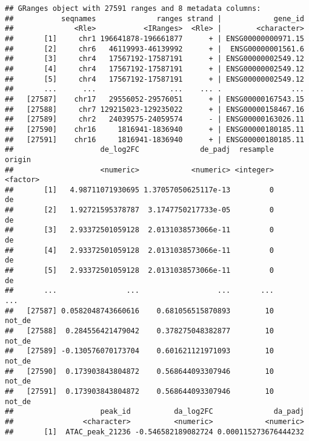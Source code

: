 \documentclass[
  9pt,
  a4paper,
]{extarticle}
\newenvironment{Shaded}{\begin{snugshade}}{\end{snugshade}}
\newcommand{\KeywordTok}[1]{\textcolor[rgb]{0.13,0.29,0.53}{\textbf{#1}}}
\newcommand{\NormalTok}[1]{#1}
\newcommand{\OperatorTok}[1]{\textcolor[rgb]{0.81,0.36,0.00}{\textbf{#1}}}
\newcommand{\StringTok}[1]{\textcolor[rgb]{0.31,0.60,0.02}{#1}}
\begin{document}
\begin{Shaded}
\end{Shaded}

\begin{verbatim}
## GRanges object with 27591 ranges and 8 metadata columns:
##           seqnames              ranges strand |            gene_id
##              <Rle>           <IRanges>  <Rle> |        <character>
##       [1]     chr1 196641878-196661877      + | ENSG00000000971.15
##       [2]     chr6   46119993-46139992      + |  ENSG00000001561.6
##       [3]     chr4   17567192-17587191      + | ENSG00000002549.12
##       [4]     chr4   17567192-17587191      + | ENSG00000002549.12
##       [5]     chr4   17567192-17587191      + | ENSG00000002549.12
##       ...      ...                 ...    ... .                ...
##   [27587]    chr17   29556052-29576051      + | ENSG00000167543.15
##   [27588]     chr7 129215023-129235022      + | ENSG00000158467.16
##   [27589]     chr2   24039575-24059574      - | ENSG00000163026.11
##   [27590]    chr16     1816941-1836940      + | ENSG00000180185.11
##   [27591]    chr16     1816941-1836940      + | ENSG00000180185.11
##                    de_log2FC              de_padj  resample   origin
##                    <numeric>            <numeric> <integer> <factor>
##       [1]   4.98711071930695 1.37057050625117e-13         0       de
##       [2]   1.92721595378787  3.1747750217733e-05         0       de
##       [3]   2.93372501059128  2.0131038573066e-11         0       de
##       [4]   2.93372501059128  2.0131038573066e-11         0       de
##       [5]   2.93372501059128  2.0131038573066e-11         0       de
##       ...                ...                  ...       ...      ...
##   [27587] 0.0582048743660616    0.681056515870893        10   not_de
##   [27588]  0.284556421479042    0.378275048382877        10   not_de
##   [27589] -0.130576070173704    0.601621121971093        10   not_de
##   [27590]  0.173903843804872    0.568644093307946        10   not_de
##   [27591]  0.173903843804872    0.568644093307946        10   not_de
##                    peak_id          da_log2FC              da_padj
##                <character>          <numeric>            <numeric>
##       [1]  ATAC_peak_21236 -0.546582189082724 0.000115273676444232

\end{verbatim}
\end{document}
